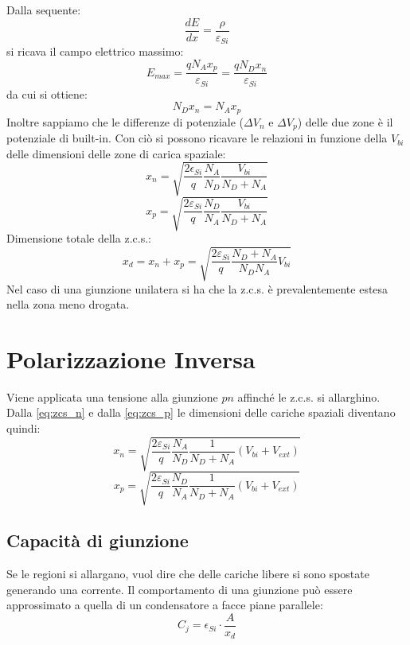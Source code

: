 \documentclass{article}
\begin{document}
Dalla sequente:
\begin{equation*}
\frac{dE}{dx} = \frac{\rho}{\varepsilon_{Si}}
\end{equation*}
si ricava il campo elettrico massimo:
\begin{equation} \label{eq:e_max}
E_{max} = \frac{qN_Ax_p}{\varepsilon_{Si}} = \frac{qN_Dx_n}{\varepsilon_{Si}}
\end{equation}
da cui si ottiene:
\begin{equation*}
N_Dx_n = N_Ax_p
\end{equation*}
Inoltre sappiamo che le differenze di potenziale ($\Delta V_n$ e $\Delta V_p$) delle due zone è il potenziale di built-in. Con ciò si possono ricavare le relazioni in funzione della $V_{bi}$ delle dimensioni delle zone di carica spaziale:
\begin{equation} \label{eq:zcs_n}
x_n = \sqrt{\frac{2\epsilon_{Si}}{q} \frac{N_A}{N_D} \frac{V_{bi}}{N_D+N_A}}
\end{equation}
\begin{equation} \label{eq:zcs_p}
x_p = \sqrt{\frac{2\varepsilon_{Si}}{q} \frac{N_D}{N_A} \frac{V_{bi}}{N_D+N_A}}
\end{equation}
Dimensione totale della z.c.s.:
\begin{equation*}
x_d = x_n + x_p = \sqrt{\frac{2\varepsilon_{Si}}{q} \frac{N_D+N_A}{N_DN_A} V_{bi}}
\end{equation*}
Nel caso di una giunzione unilatera si ha che la z.c.s. è prevalentemente estesa nella zona meno drogata.

\section*{Polarizzazione Inversa}
Viene applicata una tensione alla giunzione $pn$ affinché le z.c.s. si allarghino. Dalla \eqref{eq:zcs_n} e dalla \eqref{eq:zcs_p} le dimensioni delle cariche spaziali diventano quindi:
\begin{equation*}
x_n = \sqrt{\frac{2\varepsilon_{Si}}{q} \frac{N_A}{N_D} \frac{1}{N_D+N_A} (V_{bi} + V_{ext})}
\end{equation*}
\begin{equation*}
x_p = \sqrt{\frac{2\varepsilon_{Si}}{q} \frac{N_D}{N_A} \frac{1}{N_D+N_A} (V_{bi} + V_{ext})}
\end{equation*}

\subsection*{Capacità di giunzione}
Se le regioni si allargano, vuol dire che delle cariche libere si sono spostate generando una corrente.
Il comportamento di una giunzione può essere approssimato a quella di un condensatore a facce piane parallele:
\begin{equation*}
C_j = \epsilon_{Si} \cdot \frac{A}{x_d}
\end{equation*}
\end{document}
